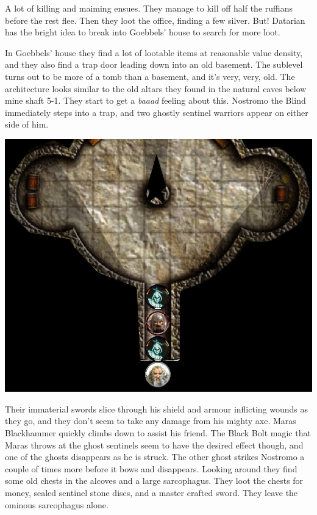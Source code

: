 A lot of killing and maiming ensues. They manage to kill off half the ruffians before the rest flee. Then they loot the office, finding a few silver. But! Datarian has the bright idea to break into Goebbels' house to search for more loot.

In Goebbels' house they find a lot of lootable items at reasonable value density, and they also find a trap door leading down into an old basement. The sublevel turns out to be more of a tomb than a basement, and it's very, very, old. The architecture looks similar to the old altars they found in the natural caves below mine shaft 5-1. They start to get a \emph{baaad} feeling about this.
Nostromo the Blind immediately steps into a trap, and two ghostly sentinel warriors appear on either side of him.

\begin{center}
\vspace{0.5 cm}
\includegraphics[width=0.7\linewidth]{./figs/playthrough/goebbels-basement.jpg}
\vspace{0.5 cm}
\end{center}

Their immaterial swords slice through his shield and armour inflicting wounds as they go, and they don't seem to take any damage from his mighty axe. Maras Blackhammer quickly climbs down to assist his friend.
The Black Bolt magic that Maras throws at the ghost sentinels seem to have the desired effect though, and one of the ghosts disappears as he is struck. The other ghost strikes Nostromo a couple of times more before it bows and disappears.
Looking around they find some old chests in the alcoves and a large sarcophagus. They loot the chests for money, sealed sentinel stone discs, and a master crafted sword. They leave the ominous sarcophagus alone.

